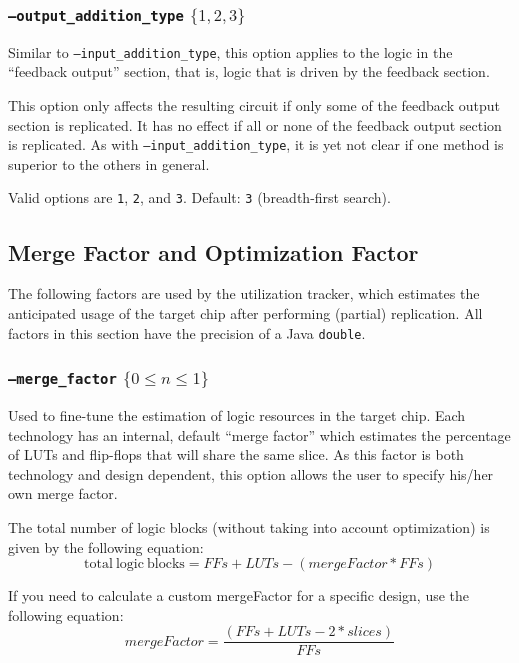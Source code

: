 \subsubsection{\texttt{--output\_addition\_type} $\{1,2,3\}$}
Similar to \texttt{--input\_addition\_type}, this option applies to the logic 
in the ``feedback output'' section, that is, logic that is driven by the
feedback section.

This option only affects the resulting circuit if only some of the feedback 
output section is replicated. It has no effect if all or none of the feedback 
output section is replicated. As with \texttt{--input\_addition\_type}, it is
yet not clear if one method is superior to the others in general.

Valid options are \texttt{1}, \texttt{2}, and \texttt{3}. Default: \texttt{3} 
(breadth-first search).

\subsection{Merge Factor and Optimization Factor}
The following factors are used by the utilization tracker, which estimates the 
anticipated usage of the target chip after performing (partial) replication\@.
All factors in this section have the precision of a Java \texttt{double}. 

\subsubsection{\texttt{--merge\_factor} $\{ 0 \leq n \leq 1 \}$ }
Used to fine-tune the estimation of logic resources in the target chip. Each 
technology has an internal, default ``merge factor'' which estimates the 
percentage of LUTs and flip-flops that will share the same slice. As this 
factor is both technology and design dependent, this option allows the user to 
specify his/her own merge factor. 

The total number of logic blocks (without taking into account optimization) is 
given by the following equation:
\begin{equation*}
\mathrm{total~logic~blocks} = FFs + LUTs - (mergeFactor * FFs)
\end{equation*}

If you need to calculate a custom mergeFactor for a specific design, use the 
following equation:
\begin{equation*}
mergeFactor = \frac{(FFs + LUTs - 2 * slices)}{FFs}
\end{equation*}

